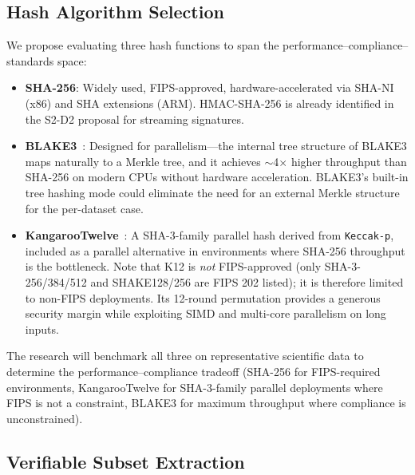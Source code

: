 \documentclass[11pt]{article}
\begin{document}
\subsection{Hash Algorithm Selection}
\label{sec:hash-select}

We propose evaluating three hash functions to span the
performance--compliance--standards space:

\begin{itemize}[nosep]
  \item \textbf{SHA-256}: Widely used, FIPS-approved, hardware-accelerated via
    SHA-NI (x86) and SHA extensions (ARM). HMAC-SHA-256 is already identified
    in the S2-D2 proposal for streaming signatures.
  \item \textbf{BLAKE3}~\cite{blake3}: Designed for parallelism---the internal
    tree structure of BLAKE3 maps naturally to a Merkle tree, and it achieves
    $\sim$4$\times$ higher throughput than SHA-256 on modern CPUs without
    hardware acceleration. BLAKE3's built-in tree hashing mode could eliminate
    the need for an external Merkle structure for the per-dataset case.
  \item \textbf{KangarooTwelve}~\cite{k12}: A SHA-3-family parallel hash
    derived from \texttt{Keccak-p}, included as a parallel alternative in
    environments where SHA-256 throughput is the bottleneck. Note that K12 is
    \emph{not} FIPS-approved (only SHA-3-256/384/512 and SHAKE128/256 are FIPS
    202 listed); it is therefore limited to non-FIPS deployments. Its 12-round
    permutation provides a generous security margin while exploiting SIMD and
    multi-core parallelism on long inputs.
\end{itemize}

\noindent The research will benchmark all three on representative scientific
data to determine the performance--compliance tradeoff (SHA-256 for FIPS-required
environments, KangarooTwelve for SHA-3-family parallel deployments where FIPS
is not a constraint, BLAKE3 for maximum throughput where compliance is
unconstrained).

\subsection{Verifiable Subset Extraction}
\label{sec:subset}
\end{document}
